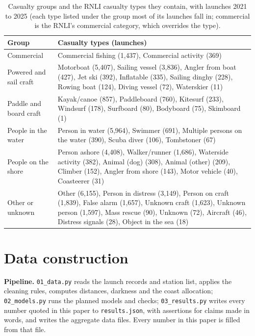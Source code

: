 \documentclass[11pt,a4paper]{article}
\begin{document}
\begin{table}[tbp]\centering\scriptsize\caption{Casualty groups and the RNLI casualty types they contain, with launches 2021 to 2025 (each type listed under the group most of its launches fall in; commercial is the RNLI's commercial category, which overrides the type).}\label{tab:types}\begin{tabular}{lp{12.2cm}}\toprule Group & Casualty types (launches)\\\midrule
Commercial & Commercial fishing (1,437), Commercial activity (369)\\
Powered and sail craft & Motorboat (5,407), Sailing vessel (3,836), Angler from boat (427), Jet ski (392), Inflatable (335), Sailing dinghy (228), Rowing boat (124), Diving vessel (72), Waterskier (11)\\
Paddle and board craft & Kayak/canoe (857), Paddleboard (760), Kitesurf (233), Windsurf (178), Surfboard (80), Bodyboard (75), Skimboard (1)\\
People in the water & Person in water (5,964), Swimmer (691), Multiple persons on the water (390), Scuba diver (106), Tombstoner (67)\\
People on the shore & Person ashore (4,408), Walker/runner (1,686), Waterside activity (382), Animal (dog) (308), Animal (other) (209), Climber (152), Angler from shore (143), Motor vehicle (40), Coasteerer (31)\\
Other or unknown & Other (6,155), Person in distress (3,149), Person on craft (1,839), False alarm (1,657), Unknown craft (1,623), Unknown person (1,597), Mass rescue (90), Unknown (72), Aircraft (46), Distress signals (28), Object in the sea (18)\\
\bottomrule\end{tabular}\end{table}

\section{Data construction}\label{app:data}
\textbf{Pipeline.} \texttt{01\_data.py} reads the launch records and station list, applies the cleaning rules, computes distances, darkness and the coast allocation; \texttt{02\_models.py} runs the planned models and checks; \texttt{03\_results.py} writes every number quoted in this paper to \texttt{results.json}, with assertions for claims made in words, and writes the aggregate data files. Every number in this paper is filled from that file.
\end{document}
